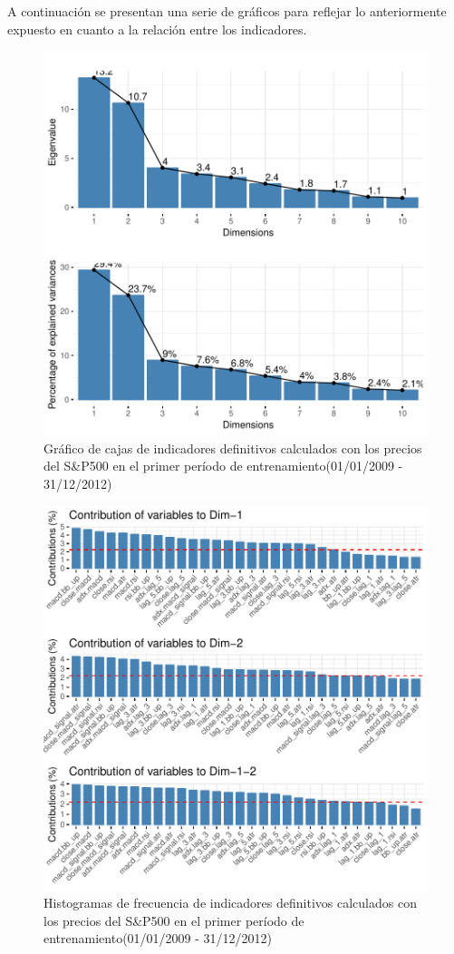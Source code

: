 \documentclass[a4paper,12pt]{Latex/Classes/PhDthesisPSnPDF}
\begin{document}
A continuación se presentan una serie de gráficos para reflejar lo anteriormente expuesto en cuanto a la relación entre los indicadores.


\begin{figure}[H]
\centering
\includegraphics{main-008}
\caption{Gráfico de cajas de indicadores definitivos calculados con los precios del S\&P500 en el primer período de entrenamiento(01/01/2009 - 31/12/2012)}
\end{figure}

\begin{figure}[H]
\centering
\includegraphics{main-009}
\caption{Histogramas de frecuencia de indicadores definitivos calculados con los precios del S\&P500 en el primer período de entrenamiento(01/01/2009 - 31/12/2012)}
\end{figure}
\end{document}

